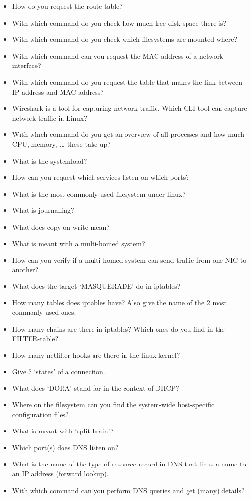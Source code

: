 \documentclass{article}
\begin{document}
\begin{itemize}
    \item How do you request the route table?
    \item With which command do you check how much free disk space there is?
    \item With which command do you check which filesystems are mounted where?
    \item With which command can you request the MAC address of a network interface?
    \item With which command do you request the table that makes the link between IP address and MAC address?
    \item Wireshark is a tool for capturing network traffic. Which CLI tool can capture network traffic in Linux?
    \item With which command do you get an overview of all processes and how much CPU, memory, ... these take up?
    \item What is the systemload?
    \item How can you request which services listen on which ports?
    \item What is the most commonly used filesystem under linux?
    \item What is journalling?
    \item What does copy-on-write mean?
    \item What is meant with a multi-homed system?
    \item How can you verify if a multi-homed system can send traffic from one NIC to another?
    \item What does the target `MASQUERADE' do in iptables?
    \item How many tables does iptables have? Also give the name of the 2 most commonly used ones.
    \item How many chains are there in iptables? Which ones do you find in the FILTER-table?
    \item How many netfilter-hooks are there in the linux kernel?
    \item Give 3 `states' of a connection.
    \item What does `DORA' stand for in the context of DHCP?
    \item Where on the filesystem can you find the system-wide host-specific configuration files?
    \item What is meant with `split brain'?
    \item Which port(s) does DNS listen on?
    \item What is the name of the type of resource record in DNS that links a name to an IP address (forward lookup).
    \item With which command can you perform DNS queries and get (many) details?
\end{itemize}
\end{document}
